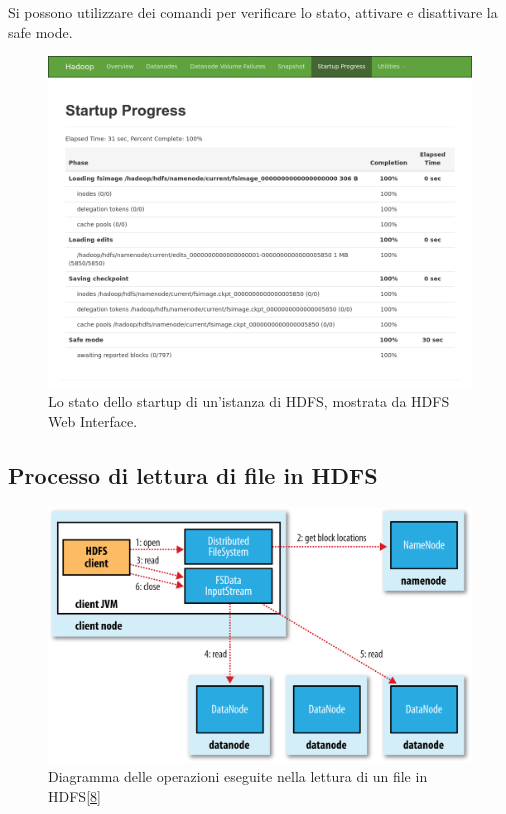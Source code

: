 \documentclass[italian,a4paper, twoside, 12pt]{report}
\newenvironment{Shaded}{}{}
\newcommand{\ExtensionTok}[1]{#1}
\newcommand{\NormalTok}[1]{#1}
\begin{document}
Si possono utilizzare dei comandi per verificare lo stato, attivare e
disattivare la safe mode.

\begin{Shaded}
\end{Shaded}

\begin{figure}
\centering
\includegraphics{img/hdfs-web-startup.png}
\caption{Lo stato dello startup di un'istanza di HDFS, mostrata da HDFS
Web Interface.}
\end{figure}

\subsection{Processo di lettura di file in
HDFS}\label{processo-di-lettura-di-file-in-hdfs}

\begin{figure}
\centering
\includegraphics{img/hdfs-file-read.png}
\caption{Diagramma delle operazioni eseguite nella lettura di un file in
HDFS{[}\protect\hyperlink{ref-hadoop-guide-hdfs-file-read}{8}{]}}
\end{figure}
\end{document}
